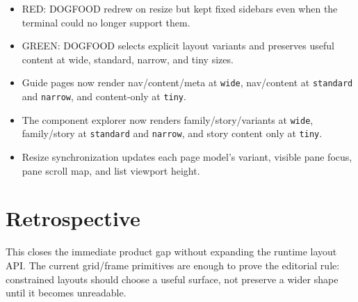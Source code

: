 \begin{itemize}
\tightlist
\item
  RED: DOGFOOD redrew on resize but kept fixed sidebars even when the terminal could no longer support them.
\item
  GREEN: DOGFOOD selects explicit layout variants and preserves useful content at wide, standard, narrow, and tiny sizes.
\item
  Guide pages now render nav/content/meta at \texttt{w\allowbreak{}i\allowbreak{}d\allowbreak{}e}, nav/content at \texttt{s\allowbreak{}t\allowbreak{}a\allowbreak{}n\allowbreak{}d\allowbreak{}a\allowbreak{}r\allowbreak{}d} and \texttt{n\allowbreak{}a\allowbreak{}r\allowbreak{}r\allowbreak{}o\allowbreak{}w}, and content-only at \texttt{t\allowbreak{}i\allowbreak{}n\allowbreak{}y}.
\item
  The component explorer now renders family/story/variants at \texttt{w\allowbreak{}i\allowbreak{}d\allowbreak{}e}, family/story at \texttt{s\allowbreak{}t\allowbreak{}a\allowbreak{}n\allowbreak{}d\allowbreak{}a\allowbreak{}r\allowbreak{}d} and \texttt{n\allowbreak{}a\allowbreak{}r\allowbreak{}r\allowbreak{}o\allowbreak{}w}, and story content only at \texttt{t\allowbreak{}i\allowbreak{}n\allowbreak{}y}.
\item
  Resize synchronization updates each page model's variant, visible pane focus, pane scroll map, and list viewport height.
\end{itemize}

\section{Retrospective}\label{record-108-retrospective}

This closes the immediate product gap without expanding the runtime layout API. The current grid/frame primitives are enough to prove the editorial rule: constrained layouts should choose a useful surface, not preserve a wider shape until it becomes unreadable.

